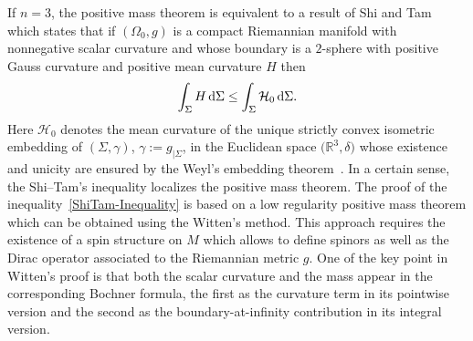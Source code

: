 \documentclass[pdftex]{sigma}
\numberwithin{equation}{section}
\begin{document}
If $n=3$, the positive mass theorem is equivalent to a result of Shi and Tam~\cite{ShiTam1} which states that if $(\Omega_0,g)$ is a compact Riemannian manifold with nonnegative scalar curvature and whose boundary is a $2$-sphere with positive Gauss curvature and positive mean curvature $H$ then
\begin{gather}\label{ShiTam-Inequality}
\int_\Sigma H\,{\rm d}\Sigma\leq \int_\Sigma \mathcal{H}_0\,{\rm d}\Sigma.
\end{gather}
Here $\mathcal{H}_0$ denotes the mean curvature of the unique strictly convex isometric embedding of $(\Sigma,\gamma)$, $\gamma:=g_{|\Sigma}$, in the Euclidean space $\big(\mathbb{R}^{3},\delta\big)$ whose existence and unicity are ensured by the Weyl's embedding theorem~\cite{Nirenberg,Pogorelov}. In a certain sense, the Shi--Tam's inequality localizes the positive mass theorem. The proof of the inequality~\eqref{ShiTam-Inequality} is based on a low regularity positive mass theorem which can be obtained using the Witten's method. This approach requires the existence of a spin structure on $M$ which allows to define spinors as well as the Dirac operator associated to the Riemannian metric $g$. One of the key point in Witten's proof is that both the scalar curvature and the mass appear in the corresponding Bochner formula, the first as the curvature term in its pointwise version and the second as the boundary-at-infinity contribution in its integral version.
\end{document}
